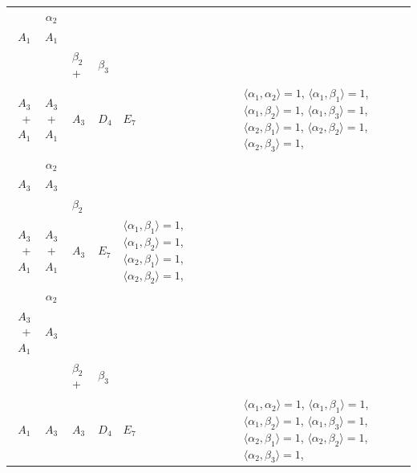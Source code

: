 \documentclass[12pt]{report}
\begin{document}
\begin{appendix}
{\begin{longtable}{rcl p{1cm}p{1cm}p{3cm} }
\\
\begin{tabular}{cc}$\alpha_1$+ & $\alpha_2$\\\tiny{ $A_1$ } & \tiny{ $A_1$ }\end{tabular} &\begin{tabular}{c} = \\~ \end{tabular} & \begin{tabular}{ccc}$\beta_1$+ & $\beta_2$+ & $\beta_3$\\\tiny{ $A_3$+$A_1$ } & \tiny{ $A_3$+$A_1$ } & \tiny{ $A_3$ }\end{tabular} & $D_4$ & $E_7$ & $\langle\alpha_1, \alpha_2\rangle=1$,  $\langle\alpha_1, \beta_1\rangle=1$, $\langle\alpha_1, \beta_2\rangle=1$, $\langle\alpha_1, \beta_3\rangle=1$, $\langle\alpha_2, \beta_1\rangle=1$, $\langle\alpha_2, \beta_2\rangle=1$, $\langle\alpha_2, \beta_3\rangle=1$, 
\\
\begin{tabular}{cc}$\alpha_1$+ & $\alpha_2$\\\tiny{ $A_3$ } & \tiny{ $A_3$ }\end{tabular} &\begin{tabular}{c} = \\~ \end{tabular} & \begin{tabular}{cc}$\beta_1$+ & $\beta_2$\\\tiny{ $A_3$+$A_1$ } & \tiny{ $A_3$+$A_1$ }\end{tabular} & $A_3$ & $E_7$ &  $\langle\alpha_1, \beta_1\rangle=1$, $\langle\alpha_1, \beta_2\rangle=1$, $\langle\alpha_2, \beta_1\rangle=1$, $\langle\alpha_2, \beta_2\rangle=1$, 
\\
\begin{tabular}{cc}$\alpha_1$+ & $\alpha_2$\\\tiny{ $A_3$+$A_1$ } & \tiny{ $A_3$ }\end{tabular} &\begin{tabular}{c} = \\~ \end{tabular} & \begin{tabular}{ccc}$\beta_1$+ & $\beta_2$+ & $\beta_3$\\\tiny{ $A_1$ } & \tiny{ $A_3$ } & \tiny{ $A_3$ }\end{tabular} & $D_4$ & $E_7$ & $\langle\alpha_1, \alpha_2\rangle=1$,  $\langle\alpha_1, \beta_1\rangle=1$, $\langle\alpha_1, \beta_2\rangle=1$, $\langle\alpha_1, \beta_3\rangle=1$, $\langle\alpha_2, \beta_1\rangle=1$, $\langle\alpha_2, \beta_2\rangle=1$, $\langle\alpha_2, \beta_3\rangle=1$, 

\end{longtable}}
\end{appendix}
\end{document}
